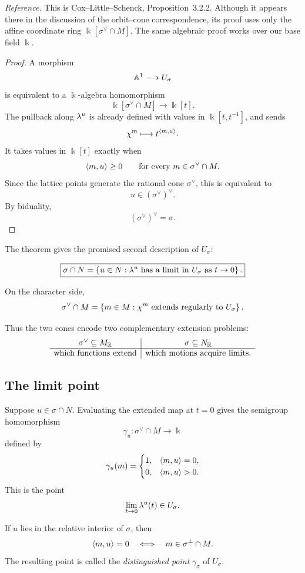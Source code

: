 \noindent
\textit{Reference.}
This is Cox--Little--Schenck, Proposition~3.2.2. Although it appears
there in the discussion of the orbit--cone correspondence, its proof
uses only the affine coordinate ring
\(\Bbbk[\sigma^\vee\cap M]\). The same algebraic proof works over our
base field \(\Bbbk\).

\begin{proof}
A morphism
\[
\mathbb{A}^1\longrightarrow U_\sigma
\]
is equivalent to a \(\Bbbk\)-algebra homomorphism
\[
\Bbbk[\sigma^\vee\cap M]\longrightarrow\Bbbk[t].
\]
The pullback along \(\lambda^{u}\) is already defined with values in
\(\Bbbk[t,t^{-1}]\), and sends
\[
\chi^{m}\longmapsto t^{\left\langle m,u\right\rangle}.
\]
It takes values in \(\Bbbk[t]\) exactly when
\[
\left\langle m,u\right\rangle\geq0
\qquad
\text{for every }m\in\sigma^\vee\cap M.
\]
Since the lattice points generate the rational cone
\(\sigma^\vee\), this is equivalent to
\[
u\in(\sigma^\vee)^\vee.
\]
By biduality,
\[
(\sigma^\vee)^\vee=\sigma.
\]
\end{proof}

The theorem gives the promised second description of \(U_\sigma\):

\[
\boxed{
\sigma\cap N
=
\left\{
u\in N:
\lambda^{u}\text{ has a limit in }U_\sigma
\text{ as }t\to0
\right\}.
}
\]

On the character side,
\[
\sigma^\vee\cap M
=
\left\{
m\in M:
\chi^{m}\text{ extends regularly to }U_\sigma
\right\}.
\]

Thus the two cones encode two complementary extension problems:
\[
\begin{array}{c|c}
\sigma^\vee\subseteq M_{\mathbb{R}}
&
\sigma\subseteq N_{\mathbb{R}}
\\
\hline
\text{which functions extend}
&
\text{which motions acquire limits}.
\end{array}
\]

\subsection{The limit point}

Suppose \(u\in\sigma\cap N\). Evaluating the extended map at \(t=0\)
gives the semigroup homomorphism
\[
\gamma_u:\sigma^\vee\cap M\longrightarrow\Bbbk
\]
defined by
\[
\gamma_u(m)
=
\begin{cases}
1,&\left\langle m,u\right\rangle=0,\\
0,&\left\langle m,u\right\rangle>0.
\end{cases}
\]
This is the point
\[
\lim_{t\to0}\lambda^{u}(t)\in U_\sigma.
\]

If \(u\) lies in the relative interior of \(\sigma\), then
\[
\left\langle m,u\right\rangle=0
\quad\Longleftrightarrow\quad
m\in\sigma^\perp\cap M.
\]
The resulting point is called the \emph{distinguished point}
\(\gamma_\sigma\) of \(U_\sigma\).

